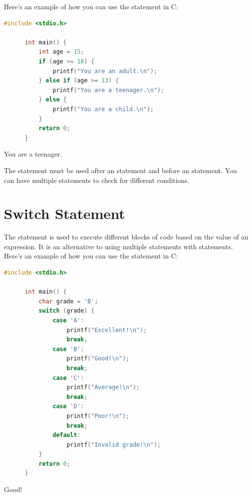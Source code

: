 \documentclass[12pt, openany]{book}
\begin{document}
  Here's an example of how you can use the  statement in C:
  \begin{lstlisting}[language=C, caption=Using Else If Statement in C]
      #include <stdio.h>
      
      int main() {
          int age = 15;
          if (age >= 18) {
              printf("You are an adult.\n");
          } else if (age >= 13) {
              printf("You are a teenager.\n");
          } else {
              printf("You are a child.\n");
          }
          return 0;
      }
  \end{lstlisting}
  \begin{tcolorbox}[colback=lightgray!10, colframe=black, title=Output]
      You are a teenager.
  \end{tcolorbox}
  
  \begin{infobox}
      The  statement must be used after an  statement and before an  statement. You can have multiple  statements to check for different conditions.
  \end{infobox}
  
  \section{Switch Statement}
  The  statement is used to execute different blocks of code based on the value of an expression. It is an alternative to using multiple  statements with  statements. Here's an example of how you can use the  statement in C:
  \begin{lstlisting}[language=C, caption=Using Switch Statement in C]
      #include <stdio.h>
      
      int main() {
          char grade = 'B';
          switch (grade) {
              case 'A':
                  printf("Excellent!\n");
                  break;
              case 'B':
                  printf("Good!\n");
                  break;
              case 'C':
                  printf("Average!\n");
                  break;
              case 'D':
                  printf("Poor!\n");
                  break;
              default:
                  printf("Invalid grade!\n");
          }
          return 0;
      }
  \end{lstlisting}
  \begin{tcolorbox}[colback=lightgray!10, colframe=black, title=Output]
      Good!
  \end{tcolorbox}
  
\end{document}
